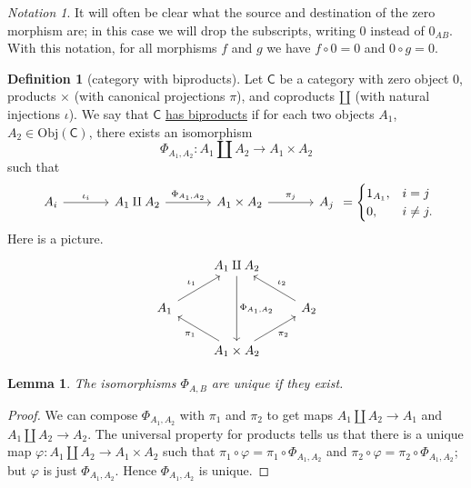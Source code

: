 \documentclass[a4paper,10pt]{scrreprt}
\newcommand{\defn}[1]{\ul{#1}}
\newcommand{\Obj}{\mathrm{Obj}}
\theoremstyle{definition}
\newtheorem{definition}{Definition}[section]
\theoremstyle{plain}
\newtheorem{lemma}{Lemma}[section]
\theoremstyle{remark}
\newtheorem{notation}{Notation}[section]
\begin{document}
\begin{notation}
  It will often be clear what the source and destination of the zero morphism are; in this case we will drop the subscripts, writing $0$ instead of $0_{AB}$. With this notation, for all morphisms $f$ and $g$ we have $f \circ 0 = 0$ and $0 \circ g = 0$.
\end{notation}

\begin{definition}[category with biproducts]
  \label{def:categorywithbiproducts}
  Let $\mathsf{C}$ be a category with zero object $0$, products $\times$ (with canonical projections $\pi$), and coproducts $\amalg$ (with natural injections $\iota$). We say that $\mathsf{C}$ \defn{has biproducts} if for each two objects $A_{1}$, $A_{2} \in \Obj(\mathsf{C})$, there exists an isomorphism
  \begin{equation*}
    \Phi_{A_{1}, A_{2}}\colon A_{1} \amalg A_{2} \to A_{1} \times A_{2}
  \end{equation*}
  such that 
  \begin{equation*}
    \begin{tikzcd}[column sep=large]
      A_{i}
      \arrow[r, "\iota_{i}"]
      & A_{1} \amalg A_{2} 
      \arrow[r, "{\Phi_{A_{1}, A_{2}}}"]
      & A_{1} \times A_{2}
      \arrow[r, "\pi_{j}"]
      & A_{j}
    \end{tikzcd}
    =
    \begin{cases}
      1_{A_{1}}, & i = j \\
      0, & i \neq j.
    \end{cases}
  \end{equation*}
  Here is a picture.
  \begin{equation*}
    \begin{tikzcd}
      & A_{1} \amalg A_{2} 
      \arrow[dd, "\Phi_{A_{1},A_{2}}"]
      \\
      A_{1} 
      \arrow[ur, "\iota_{1}"]
      & & A_{2}
      \arrow[ul, swap, "\iota_{2}"]
      \\
      & A_{1} \times A_{2}
      \arrow[ul, "\pi_{1}"]
      \arrow[ur, swap, "\pi_{2}"]
    \end{tikzcd}
  \end{equation*}
\end{definition}

\begin{lemma}
  The isomorphisms $\Phi_{A, B}$ are unique if they exist. 
\end{lemma}
\begin{proof}
  We can compose $\Phi_{A_{1}, A_{2}}$ with $\pi_{1}$ and $\pi_{2}$ to get maps $A_{1} \amalg A_{2} \to A_{1}$ and $A_{1} \amalg A_{2} \to A_{2}$. The universal property for products tells us that there is a unique map $\varphi\colon A_{1} \amalg A_{2} \to A_{1} \times A_{2}$ such that $\pi_{1} \circ \varphi = \pi_{1} \circ \Phi_{A_{1}, A_{2}}$ and $\pi_{2} \circ \varphi = \pi_{2} \circ \Phi_{A_{1}, A_{2}}$; but $\varphi$ is just $\Phi_{A_{1}, A_{2}}$. Hence $\Phi_{A_{1}, A_{2}}$ is unique.
\end{proof}
\end{document}
